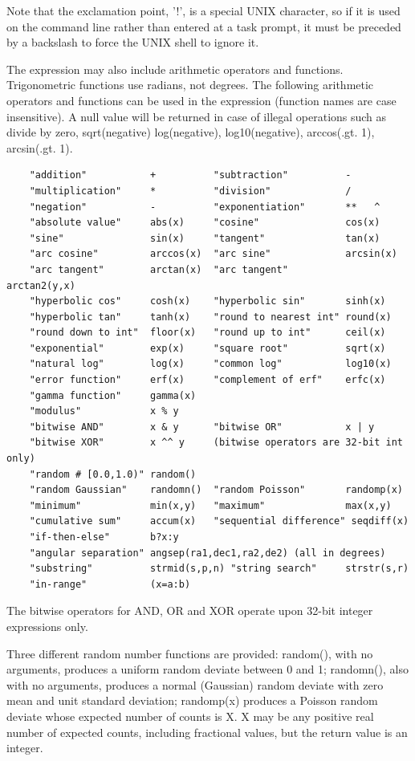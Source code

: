 \documentclass[11pt]{book}
\begin{document}
Note that the exclamation point, '!', is a special UNIX character, so
if it is used on the command line rather than entered at a task
prompt, it must be preceded by a backslash to force the UNIX shell to
ignore it.

The expression may  also include arithmetic operators and functions.
Trigonometric  functions use  radians,  not degrees.  The  following
arithmetic  operators and  functions  can be  used in the expression
(function names are case insensitive).  A null value will be returned
in case of illegal operations such as divide by zero, sqrt(negative)
log(negative), log10(negative), arccos(.gt. 1), arcsin(.gt. 1).

\begin{verbatim}
    "addition"           +          "subtraction"          -
    "multiplication"     *          "division"             /
    "negation"           -          "exponentiation"       **   ^
    "absolute value"     abs(x)     "cosine"               cos(x)
    "sine"               sin(x)     "tangent"              tan(x)
    "arc cosine"         arccos(x)  "arc sine"             arcsin(x)
    "arc tangent"        arctan(x)  "arc tangent"          arctan2(y,x)
    "hyperbolic cos"     cosh(x)    "hyperbolic sin"       sinh(x)
    "hyperbolic tan"     tanh(x)    "round to nearest int" round(x)
    "round down to int"  floor(x)   "round up to int"      ceil(x)
    "exponential"        exp(x)     "square root"          sqrt(x)
    "natural log"        log(x)     "common log"           log10(x)
    "error function"     erf(x)     "complement of erf"    erfc(x)
    "gamma function"     gamma(x)
    "modulus"            x % y      
    "bitwise AND"        x & y      "bitwise OR"           x | y
    "bitwise XOR"        x ^^ y     (bitwise operators are 32-bit int only)
    "random # [0.0,1.0)" random()
    "random Gaussian"    randomn()  "random Poisson"       randomp(x)
    "minimum"            min(x,y)   "maximum"              max(x,y)
    "cumulative sum"     accum(x)   "sequential difference" seqdiff(x)
    "if-then-else"       b?x:y
    "angular separation" angsep(ra1,dec1,ra2,de2) (all in degrees)
    "substring"          strmid(s,p,n) "string search"     strstr(s,r)
    "in-range"           (x=a:b)
\end{verbatim}
The bitwise operators for AND, OR and XOR operate upon 32-bit integer 
expressions only.

Three different random number functions are provided: random(), with
no arguments, produces a uniform random deviate between 0 and 1;
randomn(), also with no arguments, produces a normal (Gaussian) random
deviate with zero mean and unit standard deviation; randomp(x)
produces a Poisson random deviate whose expected number of counts is
X.  X may be any positive real number of expected counts, including
fractional values, but the return value is an integer.
\end{document}
